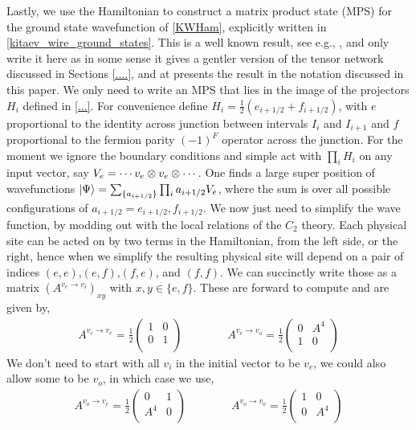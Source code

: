 Lastly, we use the Hamiltonian to construct a matrix product state (MPS) for the ground state wavefunction of \eqref{KWHam}, explicitly written in \eqref{kitaev_wire_ground_states}.
This is a well known result, see e.g., \cite{people}, and only write it here as in some sense it gives a gentler version of the tensor network discussed in Sections \ref{....}, and at presents the result in the notation discussed in this paper.
We only need to write an MPS that lies in the image of the projectors $H_i$ defined in \eqref{...}. 
For convenience define $H_i =\frac{1}{2}( e_{i+1/2} + f_{i+1/2})$, with $e$ proportional to the identity across junction between intervals $I_i$ and $I_{i+1}$ and $f$ proportional to the fermion parity $(-1)^F$ operator across the junction.
For the moment we ignore the boundary conditions and simple act with $\prod_i H_i$ on any input vector, 
say $V_e = \cdots v_{e} \otimes v_{e} \otimes \cdots $.
One finds a large super position of wavefunctions $\left|\Psi\right\rangle = \sum_{\{ a_{i+1/2} \} } \prod_i a_{i+1/2} V_e$, 
where the sum is over all possible configurations of $a_{i+1/2} = e_{i+1/2}, f_{i+1/2}$.  
We now just need to simplify the wave function, by modding out with the local relations of the $C_2$ theory. 
Each physical site can be acted on by two terms in the Hamiltonian, from the left side, or the right, hence when we simplify the resulting physical site will depend on a pair of indices $(e,e)$,$(e,f)$,$(f,e)$, and $(f,f)$. 
We can succinctly write those as a matrix $(A^{v_e \to v_i})_{xy}$ with $x,y \in \{ e, f \}$.
These are forward to compute and are given by,
\begin{align}
A^{v_e \to v_e} = 
\frac{1}{2}\left( \begin{matrix} 
1 & 0\\
0 & 1 \\
\end{matrix} \right) \quad \quad \quad \quad 
A^{v_e \to v_o} = 
\frac{1}{2}\left( \begin{matrix} 
0& A^4\\
1 & 0 \\
\end{matrix} \right)
\end{align}
We don't need to start with all $v_i$ in the initial vector to be $v_e$, we could also allow some to be $v_o$, in which case we use, 
\begin{align}
A^{v_o \to v_e} = 
\frac{1}{2}\left( \begin{matrix} 
0 & 1\\
A^4 & 0\\
\end{matrix} \right) \quad \quad \quad \quad 
A^{v_o \to v_o} = 
\frac{1}{2}\left( \begin{matrix} 
1& 0\\
0 & A^4 \\
\end{matrix} \right)
\end{align}
